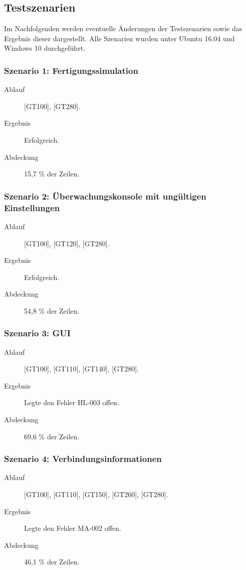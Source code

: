\documentclass[parskip=full]{scrartcl}
\begin{document}
\subsection{Testszenarien}
Im Nachfolgenden werden eventuelle Änderungen der Testszenarien sowie das Ergebnis dieser dargestellt. Alle Szenarien wurden unter Ubuntu 16.04 und Windows 10 durchgeführt.

\subsubsection{Szenario 1: Fertigungssimulation}
\begin{description}
	\item[Ablauf] [GT100], [GT280].
	\item[Ergebnis] Erfolgreich.
	\item[Abdeckung] 15,7 \% der Zeilen.
\end{description}

\subsubsection{Szenario 2: Überwachungskonsole mit ungültigen Einstellungen}
\begin{description}
	\item[Ablauf] [GT100], [GT120], [GT280].
	\item[Ergebnis] Erfolgreich.
	\item[Abdeckung] 54,8 \% der Zeilen.
\end{description}

\subsubsection{Szenario 3: GUI}
\begin{description}
	\item[Ablauf] [GT100], [GT110], [GT140], [GT280].
	\item[Ergebnis] Legte den Fehler HL-003 offen.
	\item[Abdeckung] 69,6 \% der Zeilen.
\end{description}

\subsubsection{Szenario 4: Verbindungsinformationen}
\begin{description}
	\item[Ablauf] [GT100], [GT110], [GT150], [GT260], [GT280].
	\item[Ergebnis] Legte den Fehler MA-002 offen.
	\item[Abdeckung] 46,1 \% der Zeilen.
\end{description}
\end{document}
